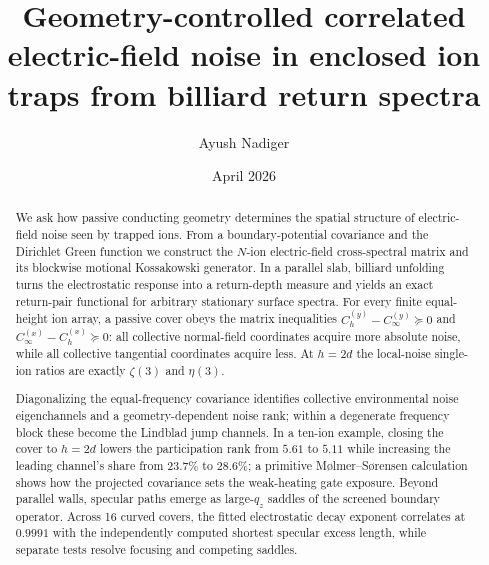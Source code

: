 \documentclass[aps,pra,twocolumn,superscriptaddress,longbibliography,nofootinbib,floatfix]{revtex4-2}
\theoremstyle{remark}
\begin{document}
\title{Geometry-controlled correlated electric-field noise in enclosed ion traps from billiard return spectra}

\author{Ayush Nadiger}

\date{April 2026}

\begin{abstract}
We ask how passive conducting geometry determines the spatial structure of electric-field noise seen by trapped ions.  From a boundary-potential covariance and the Dirichlet Green function we construct the $N$-ion electric-field cross-spectral matrix and its blockwise motional Kossakowski generator.  In a parallel slab, billiard unfolding turns the electrostatic response into a return-depth measure and yields an exact return-pair functional for arbitrary stationary surface spectra.  For every finite equal-height ion array, a passive cover obeys the matrix inequalities $C^{(y)}_h-C^{(y)}_\infty\succeq0$ and $C^{(x)}_\infty-C^{(x)}_h\succeq0$: all collective normal-field coordinates acquire more absolute noise, while all collective tangential coordinates acquire less.  At $h=2d$ the local-noise single-ion ratios are exactly $\zeta(3)$ and $\eta(3)$.

Diagonalizing the equal-frequency covariance identifies collective environmental noise eigenchannels and a geometry-dependent noise rank; within a degenerate frequency block these become the Lindblad jump channels.  In a ten-ion example, closing the cover to $h=2d$ lowers the participation rank from $5.61$ to $5.11$ while increasing the leading channel's share from $23.7\%$ to $28.6\%$; a primitive M\o lmer--S\o rensen calculation shows how the projected covariance sets the weak-heating gate exposure.  Beyond parallel walls, specular paths emerge as large-$q_z$ saddles of the screened boundary operator.  Across 16 curved covers, the fitted electrostatic decay exponent correlates at $0.9991$ with the independently computed shortest specular excess length, while separate tests resolve focusing and competing saddles.
\end{abstract}
\end{document}
